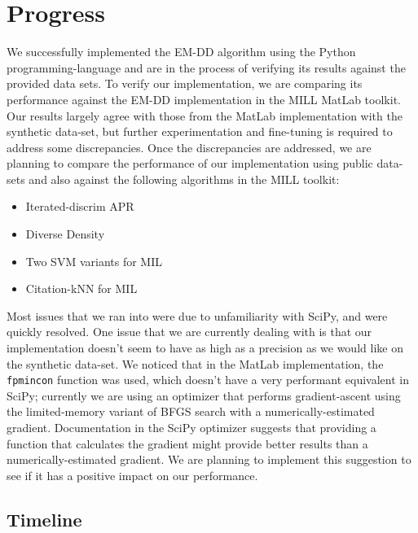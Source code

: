\documentclass[conference]{IEEEtran}
\begin{document}
\section{Progress}

We successfully implemented the EM-DD algorithm using the Python programming-language and are in the process of verifying its results against the provided data sets. To verify our implementation, we are comparing its performance against the EM-DD implementation in the MILL MatLab toolkit\cite{MILLToolkit}. Our results largely agree with those from the MatLab implementation with the synthetic data-set, but further experimentation and fine-tuning is required to address some discrepancies. Once the discrepancies are addressed, we are planning to compare the performance of our implementation using public data-sets and also against the following algorithms in the MILL toolkit:

\begin{itemize}
	\item Iterated-discrim APR
	\item Diverse Density
	\item Two SVM variants for MIL
	\item Citation-kNN for MIL
\end{itemize}

Most issues that we ran into were due to unfamiliarity with SciPy, and were quickly resolved. One issue that we are currently dealing with is that our implementation doesn't seem to have as high as a precision as we would like on the synthetic data-set. We noticed that in the MatLab implementation, the \texttt{fpmincon} function was used, which doesn't have a very performant equivalent in SciPy; currently we are using an optimizer that performs gradient-ascent using the limited-memory variant of BFGS search with a numerically-estimated gradient. Documentation in the SciPy optimizer suggests that providing a function that calculates the gradient might provide better results than a numerically-estimated gradient. We are planning to implement this suggestion to see if it has a positive impact on our performance.

\subsection{Timeline}
\end{document}

